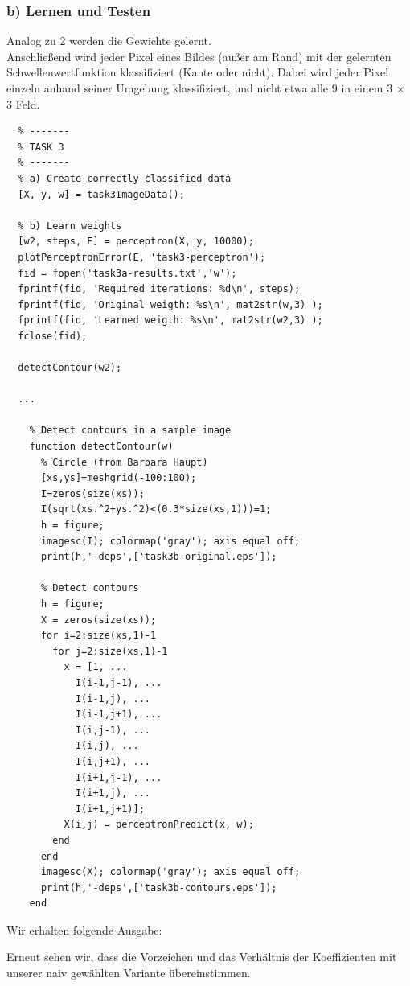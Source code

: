 \documentclass{article}
\begin{document}
	\subsubsection*{b) Lernen und Testen}
	
	Analog zu 2 werden die Gewichte gelernt.\\
	Anschließend wird jeder Pixel eines Bildes (außer am Rand) mit der gelernten Schwellenwertfunktion klassifiziert (Kante oder nicht). 
        Dabei wird jeder Pixel einzeln anhand seiner Umgebung klassifiziert, und nicht etwa alle 9 in einem 3 $\times$ 3 Feld.
	\begin{lstlisting}
  % -------
  % TASK 3
  % -------
  % a) Create correctly classified data
  [X, y, w] = task3ImageData();

  % b) Learn weights
  [w2, steps, E] = perceptron(X, y, 10000);
  plotPerceptronError(E, 'task3-perceptron');
  fid = fopen('task3a-results.txt','w');
  fprintf(fid, 'Required iterations: %d\n', steps);
  fprintf(fid, 'Original weigth: %s\n', mat2str(w,3) );
  fprintf(fid, 'Learned weigth: %s\n', mat2str(w2,3) );
  fclose(fid);

  detectContour(w2);
  
  ...
  
	% Detect contours in a sample image
	function detectContour(w)
	  % Circle (from Barbara Haupt)
	  [xs,ys]=meshgrid(-100:100);
	  I=zeros(size(xs));
	  I(sqrt(xs.^2+ys.^2)<(0.3*size(xs,1)))=1;
	  h = figure;
	  imagesc(I); colormap('gray'); axis equal off;
	  print(h,'-deps',['task3b-original.eps']);
	
	  % Detect contours
	  h = figure;
	  X = zeros(size(xs));
	  for i=2:size(xs,1)-1
	    for j=2:size(xs,1)-1
	      x = [1, ...
	        I(i-1,j-1), ...
	        I(i-1,j), ...
	        I(i-1,j+1), ...
	        I(i,j-1), ...
	        I(i,j), ...
	        I(i,j+1), ...
	        I(i+1,j-1), ...
	        I(i+1,j), ...
	        I(i+1,j+1)];
	      X(i,j) = perceptronPredict(x, w);
	    end
	  end
	  imagesc(X); colormap('gray'); axis equal off;
	  print(h,'-deps',['task3b-contours.eps']);
	end
	\end{lstlisting}
	
	Wir erhalten folgende Ausgabe:
	
	Erneut sehen wir, dass die Vorzeichen und das Verhältnis der Koeffizienten mit unserer naiv gewählten Variante übereinstimmen.\\
	
\end{document}

